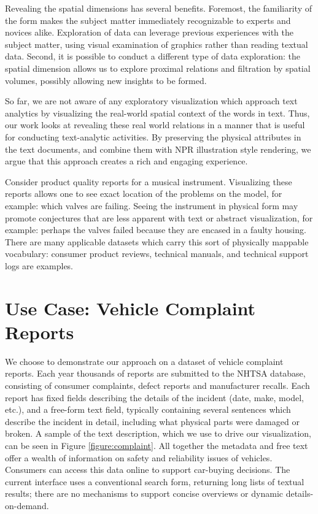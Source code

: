 Revealing the spatial dimensions has several benefits. Foremost, the
familiarity of the form makes the subject matter immediately recognizable
to experts and novices alike. Exploration of data can leverage previous 
experiences with the subject matter, using visual examination of graphics 
rather than reading textual data. Second, it is possible to conduct a different
type of data exploration: the spatial dimension allows us to explore
proximal relations and filtration by spatial volumes, possibly allowing
new insights to be formed.

So far, we are not aware of any exploratory visualization which approach text
analytics by visualizing the real-world spatial context of the words in
text. Thus, our work looks at revealing these real world relations in a manner
that is useful for conducting text-analytic activities. By preserving the physical
attributes in the text documents, and combine them with NPR illustration style 
rendering, we argue that this approach creates a rich and engaging experience.

Consider product quality reports for a musical instrument. Visualizing
these reports allows one to see exact location of the problems on the
\threed model, for example: which valves are failing. Seeing the instrument
in physical form may promote conjectures that are less apparent
with text or abstract visualization, for example: perhaps the valves
failed because they are encased in a faulty housing. There are many
applicable datasets which carry this sort of physically mappable vocabulary:
consumer product reviews, technical manuals, and technical
support logs are examples.



\section{Use Case: Vehicle Complaint Reports}
We choose to demonstrate our approach on a dataset of vehicle complaint
reports. Each year thousands of reports are submitted to the
NHTSA database, consisting of consumer complaints, defect reports
and manufacturer recalls. Each report has fixed fields describing the
details of the incident (date, make, model, etc.), and a free-form text
field, typically containing several sentences which describe the incident
in detail, including what physical parts were damaged or broken. A sample of the
text description, which we use to drive our visualization, can be seen in Figure
\ref{figure:complaint}.  All together the metadata and free
text offer a wealth of information on safety and reliability issues of
vehicles. Consumers can access this data online to support car-buying
decisions. The current interface uses a conventional search form, returning
long lists of textual results; there are no mechanisms to support
concise overviews or dynamic details-on-demand. 


